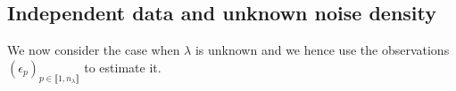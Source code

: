 %                                                                 
% 
%
\subsection{Independent data and unknown noise density}\label{FREQ_DECONV_UNKNOWN}
We now consider the case when $\lambda$ is unknown and we hence use the observations $(\epsilon_{p})_{p \in \llbracket 1, n_{\lambda} \rrbracket}$ to estimate it.
